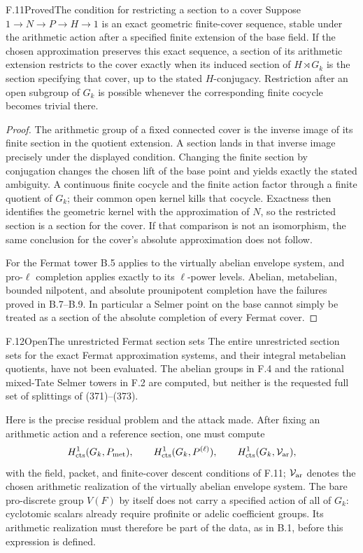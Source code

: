 \begin{statement}{F.11}{Proved}{The condition for restricting a section to a cover}
Suppose $1\to N\to P\to H\to1$ is an exact geometric
finite-cover sequence, stable under the arithmetic
action after a specified finite extension of the base
field. If the chosen approximation preserves this
exact sequence, a section of its arithmetic extension
restricts to the cover exactly when its induced section
of $H\rtimes G_k$ is the section specifying that cover,
up to the stated $H$-conjugacy. Restriction after an
open subgroup of $G_k$ is possible whenever the
corresponding finite cocycle becomes trivial there.
\end{statement}
\begin{proof}
The arithmetic group of a fixed connected cover is
the inverse image of its finite section in the
quotient extension. A section lands in that inverse
image precisely under the displayed condition.
Changing the finite section by conjugation changes
the chosen lift of the base point and yields exactly
the stated ambiguity. A continuous finite cocycle
and the finite action factor through a finite
quotient of $G_k$; their common open kernel kills
that cocycle. Exactness then identifies the geometric
kernel with the approximation of $N$, so the
restricted section is a section for the cover.
If that comparison is not an isomorphism, the
same conclusion for the cover's absolute approximation
does not follow.

For the Fermat tower B.5 applies to the virtually
abelian envelope system, and pro-$\ell$ completion
applies exactly to its $\ell$-power levels. Abelian,
metabelian, bounded nilpotent, and absolute
prounipotent completion have the failures proved
in B.7--B.9. In particular a Selmer point on the
base cannot simply be treated as a section of the
absolute completion of every Fermat cover.
\end{proof}

\begin{statement}{F.12}{Open}{The unrestricted Fermat section sets}
The entire unrestricted section sets for the exact
Fermat approximation systems, and their integral
metabelian quotients, have not been evaluated.
The abelian groups in F.4 and the rational
mixed-Tate Selmer towers in F.2 are computed,
but neither is the requested full set of
splittings of (371)--(373).
\end{statement}
Here is the precise residual problem and the attack made.
After fixing an arithmetic action and a reference section,
one must compute
\[
 H^1_{\rm cts}(G_k,P_{\rm met}),\qquad
 H^1_{\rm cts}(G_k,P^{(\ell)}),\qquad
 H^1_{\rm cts}(G_k,\mathcal V_{\rm ar}),
\]
with the field, packet, and finite-cover descent conditions
of F.11; $\mathcal V_{\rm ar}$ denotes the chosen arithmetic
realization of the virtually abelian envelope system.
The bare pro-discrete group $V(F)$ by itself does not
carry a specified action of all of $G_k$: cyclotomic
scalars already require profinite or adelic coefficient
groups. Its arithmetic realization must therefore be
part of the data, as in B.1, before this expression is
defined.

